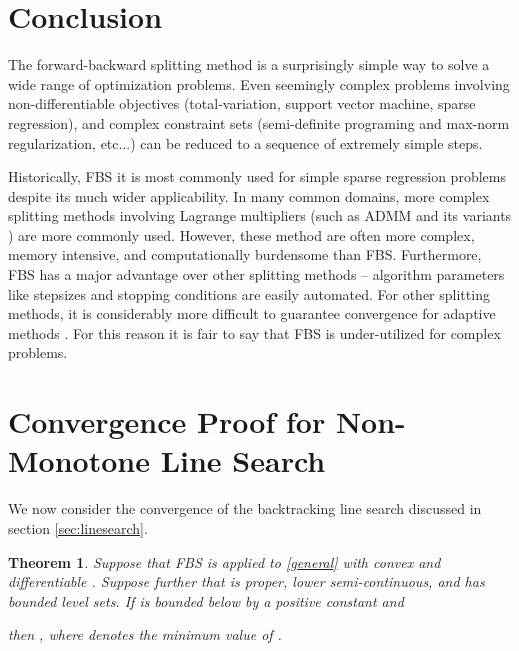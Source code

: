 \documentclass{amsart}
\newcommand{\eqn}[2]{}
\newcommand{\ra}{\rangle}
\newcommand{\la}{\langle}
\newcommand{\kp}{^{k+1}}
\newtheorem{theorem}{Theorem}
\theoremstyle{definition}
\begin{document}
\section{Conclusion}
The forward-backward splitting method is a surprisingly simple way to solve a wide range of optimization problems.  Even seemingly complex problems involving non-differentiable objectives (total-variation, support vector machine, sparse regression), and complex constraint sets (semi-definite programing and max-norm regularization, etc...) can be reduced to a sequence of extremely simple steps.

Historically, FBS it is most commonly used for simple sparse regression problems despite its much wider applicability.  In many common domains, more complex splitting methods involving Lagrange multipliers (such as ADMM \cite{GL89, BPCPE10} and its variants \cite{EZC09,CP10}) are more commonly used.  However, these method are often more complex, memory intensive, and computationally burdensome than FBS.  Furthermore, FBS has a major advantage over other splitting methods -- algorithm parameters like stepsizes and stopping conditions are easily automated.  For other splitting methods, it is considerably more difficult to guarantee convergence for adaptive methods \cite{HYW00,GEB13}.
 For this reason it is fair to say that FBS is under-utilized for complex problems. 





\newpage

\appendix
\section{Convergence Proof for Non-Monotone Line Search}

We now consider the convergence of the backtracking line search discussed in section \ref{sec:linesearch}.
  \begin{theorem} \label{thm:converge}
  Suppose that FBS is applied to \eqref{general} with convex  and differentiable .  Suppose further that  is   proper, lower semi-continuous, and has bounded level sets.     If  is bounded below by a positive constant and  
 \eqn{backtrack}{
  f(x\kp)-  \hat f^k < \\ \la x\kp -x^k, \nabla f(x^k) \ra + \frac{1}{2\tau^k}  \| x\kp-x^k\|^2 
  }
  then
  ,
  where  denotes the minimum value of .
  \end{theorem}
\end{document}
